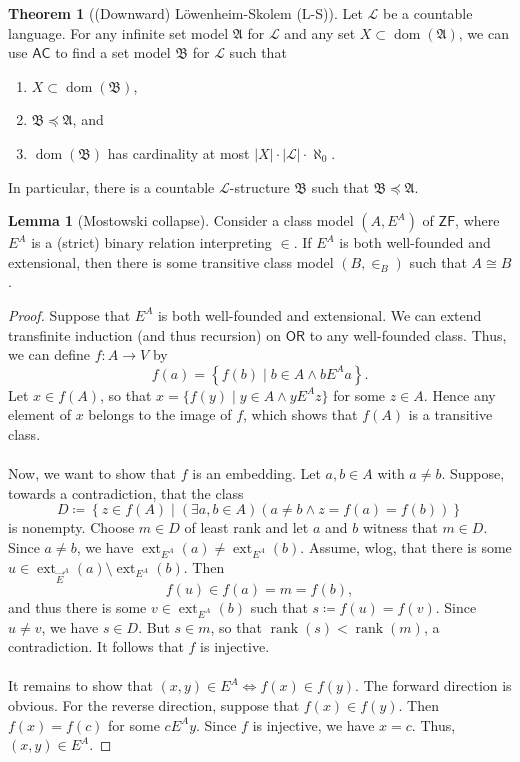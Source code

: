 \documentclass[10pt,letterpaper,cm]{nupset}
\theoremstyle{definition}
\theoremstyle{theorem}
\newtheorem{theorem}[definition]{Theorem}
\newtheorem{lemma}[definition]{Lemma}
\theoremstyle{remark}
\newcommand{\A}{\mathfrak A}
\newcommand{\E}{\vec E}
\renewcommand{\L}{\mathcal L}
\newcommand{\B}{\mathfrak{B}}
\newcommand{\1}{\mathbf{1}}
\newcommand{\0}{\vec 0}
\newcommand{\zf}{\mathsf{ZF}}
\newcommand{\ac}{\mathsf{AC}}
\newcommand{\ord}{\mathsf{OR}}
\DeclareMathOperator{\ext}{ext}
\DeclareMathOperator{\dom}{dom}
\DeclareMathOperator{\rnk}{rank}
\newcommand{\be}{\begin{enumerate}}
\newcommand{\ee}{\end{enumerate}}
\begin{document}
\begin{theorem}[(Downward) L\"owenheim-Skolem (L-S)]
Let $\L$ be a countable language. For any infinite set model $\A$ for $\L$ and any set $X\subset \dom(\A)$, we can use $\ac$ to find a set model $\B$ for $\L$ such that 
\be
\item $X\subset \dom(\B)$, 
\item $\B \preceq \A$, and
\item $\dom(\B)$ has cardinality at most $\lvert{X}\rvert \cdot \lvert{\L}\rvert \cdot \aleph_0$.
\ee 
In particular, there is a countable $\L$-structure $\B$ such that $\B \preceq \A$.
\end{theorem}


\begin{lemma}[Mostowski collapse]\label{MC}
Consider  a class model $(A, E^A)$ of $\zf$, where $E^A$ is a (strict) binary relation interpreting $\in$. If $E^A$ is both well-founded and extensional, then there is some transitive class model $(B, \in_B)$  such that $A \cong B$.
\end{lemma}
\begin{proof}
Suppose that $E^A$ is both well-founded and extensional. We can extend transfinite induction (and thus recursion) on $\ord$ to any well-founded class.  Thus, we can define $f : A \to V$ by $$ f(a) = \left\{f(b) \mid b \in A \land b{E^A}a\right\}    .$$ Let $x\in f(A)$, so that $x = \{f(y) \mid y \in A \land y{E^A}z\}$ for some $z\in A$. Hence any element of $x$ belongs to the image of $f$, which shows that $f(A)$ is a transitive class. 
\\ \\ Now, we want to show that $f$ is an embedding. Let $a, b\in A$ with $a\ne b$. Suppose, towards a contradiction, that the class $$D\coloneqq \left\{z \in f(A) \mid (\exists a,b \in A)(a\ne b \land z = f(a) = f(b))\right\}$$ is nonempty. Choose $m \in D$ of least rank and let $a$ and $b$ witness that $m \in D$. Since $a\ne b$, we have $\ext_{E^A}(a) \ne \ext_{E^A}(b)$. Assume, wlog, that there is some $u \in \ext_{\E^A}(a) \setminus \ext_{E^A}(b)$.  Then $$f(u) \in f(a) =m = f(b),$$ and thus there is some $v \in \ext_{E^A}(b)$ such that $s\coloneqq f(u) = f(v)$.  Since $u \ne v$, we have $s \in D$. But $s\in m$, so that $\rnk(s) < \rnk(m)$, a contradiction. It follows that $f$ is injective. 
\\ \\ It remains to show that $(x,y) \in E^A \iff f(x)\in f(y)$. The forward direction is obvious. For the reverse direction, suppose that $f(x) \in f(y)$. Then $f(x) = f(c)$ for some $c{E^A}y$. Since $f$ is injective, we have $x=c$. Thus, $(x,y) \in E^A$. 
\end{proof}
\end{document}
